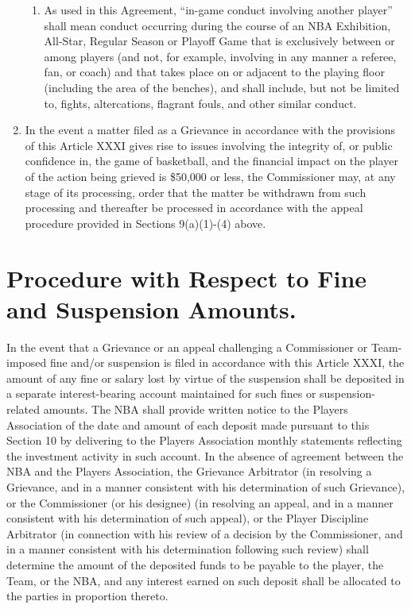 \documentclass[
]{book}
\begin{document}
\begin{enumerate}
\begin{enumerate}
  \item
    As used in this Agreement, ``in-game conduct involving another player'' shall mean conduct occurring during the course of an NBA Exhibition, All-Star, Regular Season or Playoff Game that is exclusively between or among players (and not, for example, involving in any manner a referee, fan, or coach) and that takes place on or adjacent to the playing floor (including the area of the benches), and shall include, but not be limited to, fights, altercations, flagrant fouls, and other similar conduct.
  \end{enumerate}
\item
  In the event a matter filed as a Grievance in accordance with the provisions of this Article XXXI gives rise to issues involving the integrity of, or public confidence in, the game of basketball, and the financial impact on the player of the action being grieved is \$50,000 or less, the Commissioner may, at any stage of its processing, order that the matter be withdrawn from such processing and thereafter be processed in accordance with the appeal procedure provided in Sections 9(a)(1)-(4) above.
\end{enumerate}

\hypertarget{procedure-with-respect-to-fine-and-suspension-amounts.}{%
\section{Procedure with Respect to Fine and Suspension Amounts.}\label{procedure-with-respect-to-fine-and-suspension-amounts.}}

In the event that a Grievance or an appeal challenging a Commissioner or Team-imposed fine and/or suspension is filed in accordance with this Article XXXI, the amount of any fine or salary lost by virtue of the suspension shall be deposited in a separate interest-bearing account maintained for such fines or suspension-related amounts. The NBA shall provide written notice to the Players Association of the date and amount of each deposit made pursuant to this Section 10 by delivering to the Players Association monthly statements reflecting the investment activity in such account. In the absence of agreement between the NBA and the Players Association, the Grievance Arbitrator (in resolving a Grievance, and in a manner consistent with his determination of such Grievance), or the Commissioner (or his designee) (in resolving an appeal, and in a manner consistent with his determination of such appeal), or the Player Discipline Arbitrator (in connection with his review of a decision by the Commissioner, and in a manner consistent with his determination following such review) shall determine the amount of the deposited funds to be payable to the player, the Team, or the NBA, and any interest earned on such deposit shall be allocated to the parties in proportion thereto.
\end{document}
